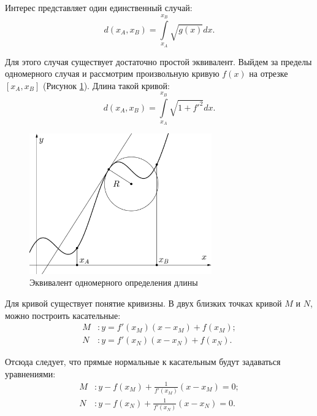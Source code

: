 \documentclass[a4paper,14pt]{extreport} %
\begin{document}
	Интерес представляет один единственный случай:
	\[
		d(x_A, x_B) =
		\int\limits_{x_A}^{x_B} \sqrt{g(x)} dx.
	\]
	
	Для этого случая существует достаточно простой эквивалент. Выйдем за пределы одномерного случая и рассмотрим произвольную кривую $f(x)$ на отрезке $[x_A, x_B]$ (Рисунок \ref{fig1krivisna}). Длина такой кривой:
	\[
		d(x_A, x_B) =
		\int\limits_{x_A}^{x_B} \sqrt{1 + f'^2} dx.
	\]
	
	\begin{figure}[ht]
		\centering
		\includegraphics[width = 0.7\textwidth]{images/png/1krivisna.png}
		\caption{Эквивалент одномерного определения длины}
		\label{fig1krivisna}
	\end{figure}
	
	Для кривой существует понятие кривизны. В двух близких точках кривой $M$ и $N$, можно построить касательные:
	\begin{equation*}
		\begin{aligned}
			M&: y = f'(x_M) (x - x_M) + f(x_M); \\
			N&: y = f'(x_N) (x - x_N) + f(x_N).
		\end{aligned}
	\end{equation*}
	
	Отсюда следует, что прямые нормальные к касательным будут задаваться уравнениями:
	\begin{equation*}
		\begin{aligned}
			M&: y - f(x_M) + \frac{1}{f'(x_M)} (x - x_M) = 0; \\
			N&: y - f(x_N) + \frac{1}{f'(x_N)} (x - x_N) = 0.
		\end{aligned}
	\end{equation*} 
	
\end{document}
